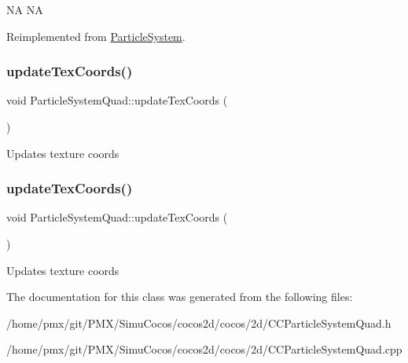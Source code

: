NA  NA 

Reimplemented from \hyperlink{classParticleSystem_a77929b8f9b3aca5d81362d3c3d80e378}{Particle\+System}.

\mbox{\label{classParticleSystemQuad_a74aafec2dfe389284d94d6694c4a7de5}} 
\subsubsection{\texorpdfstring{update\+Tex\+Coords()}{updateTexCoords()}\hspace{0.1cm}{\footnotesize\ttfamily [1/2]}}
{\footnotesize\ttfamily void Particle\+System\+Quad\+::update\+Tex\+Coords (\begin{DoxyParamCaption}{ }\end{DoxyParamCaption})\hspace{0.3cm}{\ttfamily [protected]}}

Updates texture coords \mbox{\label{classParticleSystemQuad_a74aafec2dfe389284d94d6694c4a7de5}} 
\subsubsection{\texorpdfstring{update\+Tex\+Coords()}{updateTexCoords()}\hspace{0.1cm}{\footnotesize\ttfamily [2/2]}}
{\footnotesize\ttfamily void Particle\+System\+Quad\+::update\+Tex\+Coords (\begin{DoxyParamCaption}{ }\end{DoxyParamCaption})\hspace{0.3cm}{\ttfamily [protected]}}

Updates texture coords 

The documentation for this class was generated from the following files\+:\begin{DoxyCompactItemize}
\item 
/home/pmx/git/\+P\+M\+X/\+Simu\+Cocos/cocos2d/cocos/2d/C\+C\+Particle\+System\+Quad.\+h\item 
/home/pmx/git/\+P\+M\+X/\+Simu\+Cocos/cocos2d/cocos/2d/C\+C\+Particle\+System\+Quad.\+cpp\end{DoxyCompactItemize}
